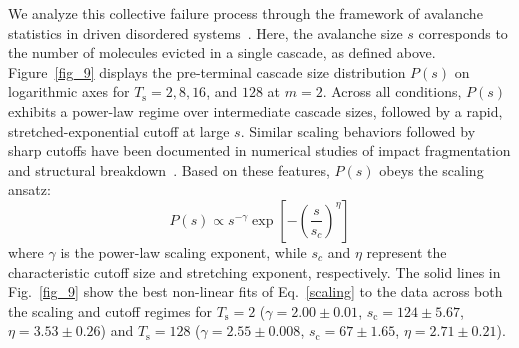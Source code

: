 \documentclass[aps,physrev,preprint,groupedaddress,linenumbers]{revtex4-2}
\begin{document}
We analyze this collective failure process through the framework of avalanche statistics in driven disordered systems~\cite{Zapperi1997a,Zapperi1999,Zapperi1997b}. Here, the avalanche size $s$ corresponds to the number of molecules evicted in a single cascade, as defined above. Figure~\ref{fig_9} displays the pre-terminal cascade size distribution $P(s)$ on logarithmic axes for $T_{\mathrm{s}} = 2, 8, 16$, and $128$ at $m = 2$. Across all conditions, $P(s)$ exhibits a power-law regime over intermediate cascade sizes, followed by a rapid, stretched-exponential cutoff at large $s$. Similar scaling behaviors followed by sharp cutoffs have been documented in numerical studies of impact fragmentation and structural breakdown~\cite{Meibom1996,Diehl2000,Diehl2002,Araujo2003}. Based on these features, $P(s)$ obeys the scaling ansatz:
\begin{equation}
P(s) \propto s^{-\gamma} \exp\left[-\left(\frac{s}{s_c}\right)^\eta\right]
\label{scaling}
\end{equation}
where $\gamma$ is the power-law scaling exponent, while $s_c$ and $\eta$ represent the characteristic cutoff size and stretching exponent, respectively. The solid lines in Fig.~\ref{fig_9} show the best non-linear fits of Eq.~\eqref{scaling} to the data across both the scaling and cutoff regimes for $T_{\mathrm{s}} = 2$ ($\gamma = 2.00 \pm 0.01$, $s_{\mathrm{c}} = 124 \pm 5.67$, $\eta = 3.53 \pm 0.26$) and $T_{\mathrm{s}} = 128$ ($\gamma = 2.55 \pm 0.008$, $s_{\mathrm{c}} = 67 \pm 1.65$, $\eta = 2.71 \pm 0.21$).
\end{document}
